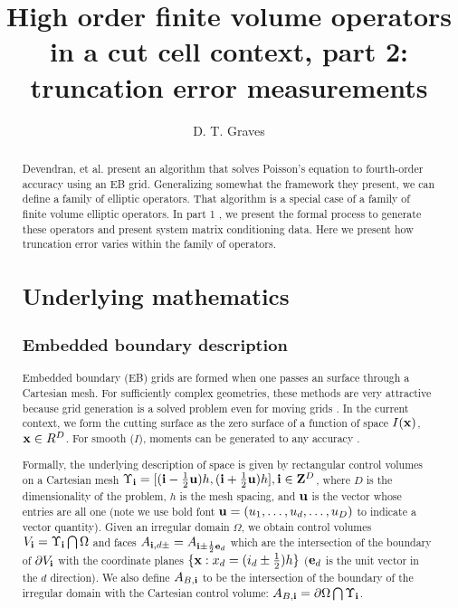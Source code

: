 \documentclass{article}
\begin{document}
\title{High order finite volume operators in a cut cell context,
  part 2: truncation error measurements}
\author{
  D. T. Graves    \footnotemark[1]
        }

\maketitle

\begin{abstract}

Devendran, et al. \cite{Devendran2017} present an algorithm that
solves Poisson's equation to fourth-order accuracy using an EB grid.
Generalizing somewhat  the framework they present, we can define a
family of elliptic operators.   That algorithm is a special case of a
family of finite volume elliptic operators.   In part 1
\cite{Devendran2023}, we present the formal 
process to generate these operators and present system matrix
conditioning data.      Here we present how truncation error varies
within the family of operators.

\section{Underlying mathematics}
\label{sec::notation}

\subsection{Embedded boundary description}
Embedded boundary (EB) grids are formed when one passes an  surface
through a Cartesian mesh.    For sufficiently complex geometries, these methods
are very attractive because grid generation is a solved problem
even for moving grids \cite{MillerTrebotich2012}.
In the current context, we form the cutting surface as the zero
surface of a function  of space $I({\bf x})$, ${\bf x} \in R^D$.
For smooth ($I$),  moments can be generated to any
accuracy \cite{Schwartz2015}.

Formally, the underlying description of space
is given by rectangular control volumes on a Cartesian mesh
$\Upsilon_{\bf i} = [({\bf i}-\frac{1}{2} {{\bf u}})h, ({\bf i}+\frac{1}{2}
{{\bf u}})h], {\bf i} \in {\bf Z}^D$, where $D$ is the dimensionality
of the problem, $h$ is the mesh spacing, and ${{\bf u}}$ is the vector
whose entries are all one (note we use bold font ${\bf u} = (u_1, \dots, u_d,
\dots, u_D)$ to indicate a vector quantity).
Given an irregular domain $\Omega$, we
obtain control volumes $V_{\bf i} = \Upsilon_{\bf i} \bigcap \Omega$ and
faces $A_{{\bf i},d\pm} = A_{{\bf i} \pm \frac{1}{2} {\bf e}_d}$ which are the
intersection of the boundary of $\partial V_{\bf i}$ with the
coordinate planes $\{{{\bf x}}:x_d = (i_d \pm \frac{1}{2})h \}$ (${\bf e}_d$ is
the unit vector in the $d$ direction).  We also
define $A_{B,{\bf i}}$ to be the intersection of the boundary of the
irregular domain with the Cartesian control volume: $A_{B,{\bf i}}
= \partial \Omega \bigcap \Upsilon_{\bf i}$. 


\end{abstract}
\end{document}
